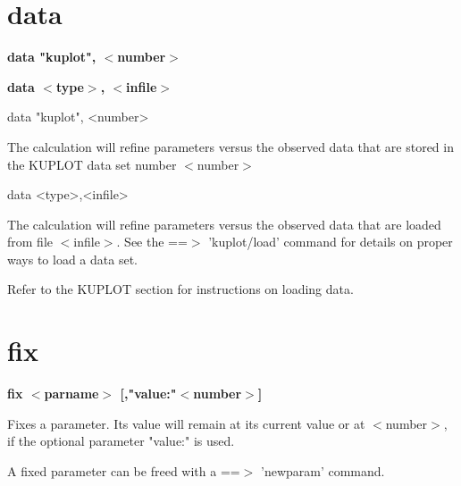\section{data}
{\bf data "kuplot", $ <$number$> $ \par }
{\bf data $ <$type$> $, $ <$infile$> $ \par }
\par
\begin{MacVerbatim}
data "kuplot", <number>
\end{MacVerbatim}
\vspace{3pt}
The calculation will refine parameters versus the observed data 
that are stored in the KUPLOT data set number $ <$number$> $ 
\par
\begin{MacVerbatim}
data <type>,<infile>
\end{MacVerbatim}
The calculation will refine parameters versus the observed data 
that are loaded from file $ <$infile$> $. 
   See the ==$> $ 'kuplot/load' command for details on proper 
   ways to load a data set. 
\par
Refer to the KUPLOT section for instructions on loading data. 
\section{fix}
{\bf fix $ <$parname$> $ [,"value:"$ <$number$> $] \par }
\par
\vspace{3pt}
Fixes a parameter. Its value will remain at its current value 
or at $ <$number$> $, if the optional parameter "value:" is used. 
\par
A fixed parameter can be freed with a ==$> $ 'newparam' command. 
